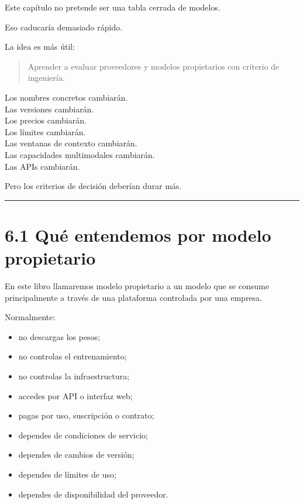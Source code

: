Este capítulo no pretende ser una tabla cerrada de modelos.

Eso caducaría demasiado rápido.

La idea es más útil:

\begin{quote}
Aprender a evaluar proveedores y modelos propietarios con criterio de
ingeniería.
\end{quote}

Los nombres concretos cambiarán.\\
Las versiones cambiarán.\\
Los precios cambiarán.\\
Los límites cambiarán.\\
Las ventanas de contexto cambiarán.\\
Las capacidades multimodales cambiarán.\\
Las APIs cambiarán.

Pero los criterios de decisión deberían durar más.

\begin{center}\rule{0.5\linewidth}{0.5pt}\end{center}

\section{6.1 Qué entendemos por modelo
propietario}\label{quuxe9-entendemos-por-modelo-propietario}

En este libro llamaremos modelo propietario a un modelo que se consume
principalmente a través de una plataforma controlada por una empresa.

Normalmente:

\begin{itemize}
\tightlist
\item
  no descargas los pesos;
\item
  no controlas el entrenamiento;
\item
  no controlas la infraestructura;
\item
  accedes por API o interfaz web;
\item
  pagas por uso, suscripción o contrato;
\item
  dependes de condiciones de servicio;
\item
  dependes de cambios de versión;
\item
  dependes de límites de uso;
\item
  dependes de disponibilidad del proveedor.
\end{itemize}

